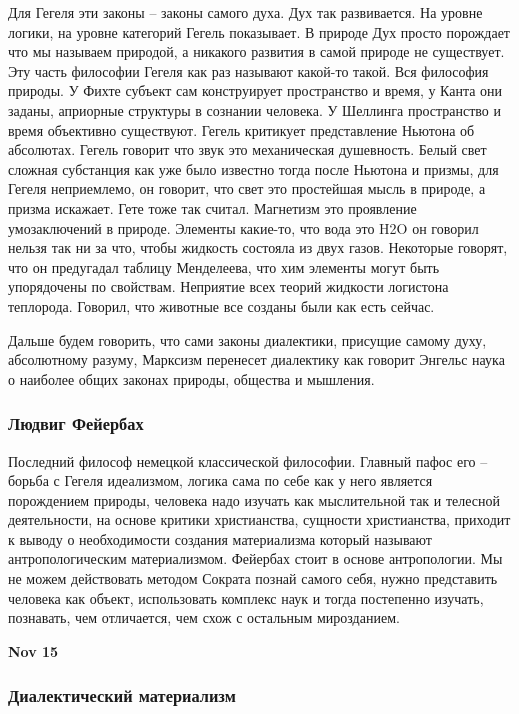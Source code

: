\documentclass[a4paper, 12pt]{article}
\begin{document}
Для Гегеля эти законы -- законы самого духа. Дух так развивается. На 
уровне логики, на уровне категорий Гегель показывает. В природе Дух 
просто порождает что мы называем природой, а никакого развития в самой 
природе не существует. Эту часть философии Гегеля как раз называют 
какой-то такой. Вся философия природы. У Фихте субъект сам конструирует 
пространство и время, у Канта они заданы, априорные структуры в сознании 
человека. У Шеллинга пространство и время объективно существуют. Гегель 
критикует представление Ньютона об абсолютах. Гегель говорит что звук 
это механическая душевность. Белый свет сложная субстанция как уже было 
известно тогда после Ньютона и призмы, для Гегеля неприемлемо, он 
говорит, что свет это простейшая мысль в природе, а призма искажает. 
Гете тоже так считал. Магнетизм это проявление умозаключений в природе. 
Элементы какие-то, что вода это H2O он говорил нельзя так ни за что, 
чтобы жидкость состояла из двух газов. Некоторые говорят, что он 
предугадал таблицу Менделеева, что хим элементы могут быть упорядочены 
по свойствам. Неприятие всех теорий жидкости логистона теплорода. 
Говорил, что животные все созданы были как есть сейчас.

Дальше будем говорить, что сами законы диалектики, присущие самому духу, 
абсолютному разуму, Марксизм перенесет диалектику как говорит Энгельс 
наука о наиболее общих законах природы, общества и мышления.

\subsubsection{Людвиг Фейербах}

Последний философ немецкой классической философии. Главный пафос его -- 
борьба с Гегеля идеализмом, логика сама по себе как у него является 
порождением природы, человека надо изучать как мыслительной так 
и телесной деятельности, на основе критики христианства, сущности 
христианства, приходит к выводу о необходимости создания материализма 
который называют антропологическим материализмом. Фейербах стоит 
в основе антропологии. Мы не можем действовать методом Сократа познай 
самого себя, нужно представить человека как объект, использовать 
комплекс наук и тогда постепенно изучать, познавать, чем отличается, чем 
схож с остальным мирозданием.

\hfill\textbf{Nov 15}

\subsubsection{Диалектический материализм}
\end{document}
